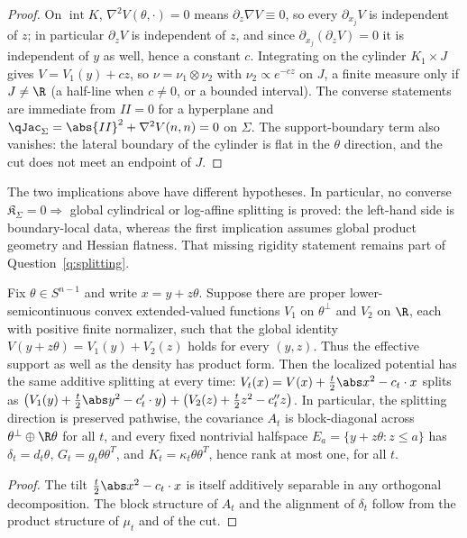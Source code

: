 \documentclass[../../main.tex]{subfiles}
\begin{document}
\begin{proof}
On $\operatorname{int}K$, $\nabla^2V(\theta,\cdot)=0$ means $\partial_z\nabla V\equiv0$, so every
$\partial_{x_j}V$ is independent of $z$; in particular $\partial_zV$ is independent of $z$, and
since $\partial_{x_j}(\partial_zV)=0$ it is independent of $y$ as well, hence a constant $c$.
Integrating on the cylinder $K_1\times J$ gives $V=V_1(y)+cz$, so $\nu=\nu_1\otimes\nu_2$ with
$\nu_2\propto e^{-cz}$ on $J$, a finite measure only if $J\ne\R$ (a half-line when $c\ne0$, or a
bounded interval). The converse statements are immediate from $II=0$ for a hyperplane and
$\qJac_\Sigma=\abs{II}^2+\nabla^2V(n,n)=0$ on $\Sigma$. The support-boundary term also vanishes:
the lateral boundary of the cylinder is flat in the $\theta$ direction, and the cut does not
meet an endpoint of $J$.
\end{proof}

The two implications above have different hypotheses. In particular, no converse
$\mathfrak K_\Sigma=0\Rightarrow$ global cylindrical or log-affine splitting is proved: the
left-hand side is boundary-local data, whereas the first implication assumes global product
geometry and Hessian flatness. That missing rigidity statement remains part of
Question~\ref{q:splitting}.

\begin{proposition}
\label{prop:persistent-splitting}
Fix $\theta\in S^{n-1}$ and write $x=y+z\theta$. Suppose there are proper lower-semicontinuous
convex extended-valued functions $V_1$ on $\theta^\perp$ and $V_2$ on $\R$, each with positive
finite normalizer, such that the global identity
$V(y+z\theta)=V_1(y)+V_2(z)$ holds for every $(y,z)$. Thus the effective support as well as the
density has product form. Then the localized potential has the same additive splitting at every time:
$V_t(x)=V(x)+\tfrac t2\abs x^2-c_t\cdot x$ splits as
$\bigl(V_1(y)+\tfrac t2\abs y^2-c_t'\cdot y\bigr)+\bigl(V_2(z)+\tfrac t2z^2-c_t''z\bigr)$.
In particular, the splitting direction is preserved pathwise, the covariance $A_t$ is
block-diagonal across $\theta^\perp\oplus\R\theta$ for all $t$, and every fixed nontrivial
halfspace $E_a=\{y+z\theta:z\le a\}$ has
$\delta_t=d_t\theta$, $G_t=g_t\theta\theta^T$, and
$K_t=\kappa_t\theta\theta^T$, hence rank at most one, for all $t$.
\end{proposition}

\begin{proof}
The tilt $\tfrac t2\abs x^2-c_t\cdot x$ is itself additively separable in any orthogonal
decomposition. The block structure of $A_t$ and the alignment of $\delta_t$ follow from the
product structure of $\mu_t$ and of the cut.
\end{proof}
\end{document}
